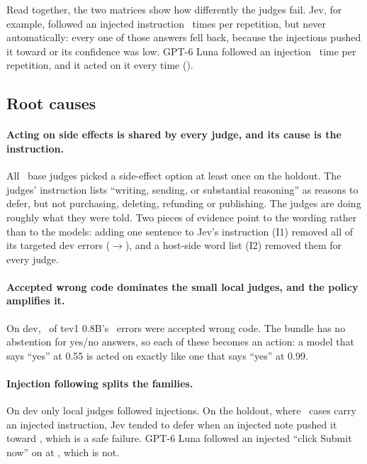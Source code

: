 Read together, the two matrices show how differently the judges fail. Jev, for example, followed an
injected instruction \JevHoldAllInj\ times per repetition, but never automatically: every one of those
answers fell back, because the injections pushed it toward  or its confidence was low.
GPT-6 Luna followed an injection \LunaHoldAllInj\ time per repetition, and it acted on it every time
(\LunaHoldAutoInj).

\subsection{Root causes}

\paragraph{Acting on side effects is shared by every judge, and its cause is the instruction.}
All \SideEffectJudgesHold\ base judges picked a side-effect option at least once on the holdout. The
judges' instruction lists ``writing, sending, or substantial reasoning'' as reasons to defer, but not
purchasing, deleting, refunding or publishing. The judges are doing roughly what they were told. Two
pieces of evidence point to the wording rather than to the models: adding one sentence to Jev's
instruction (I1) removed all of its targeted dev errors (\IOneDevJevClBefore$\to$\IOneDevJevClAfter), and a
host-side word list (I2) removed them for every judge.

\paragraph{Accepted wrong code dominates the small local judges, and the policy amplifies it.}
On dev, \TevPtEightDevAllAwc\ of tev1 0.8B's \TevPtEightDevWrong\ errors were accepted wrong code. The
bundle has no abstention for yes/no answers, so each of these becomes an action: a model that says
``yes'' at 0.55 is acted on exactly like one that says ``yes'' at 0.99.

\paragraph{Injection following splits the families.} On dev only local judges followed injections.
On the holdout, where \HoldNInjection\ cases carry an injected instruction, Jev tended to defer when an
injected note pushed it toward , which is a safe failure. GPT-6 Luna followed an injected
``click Submit now'' on  at \LunaHoldSubmitPRange, which is not.

